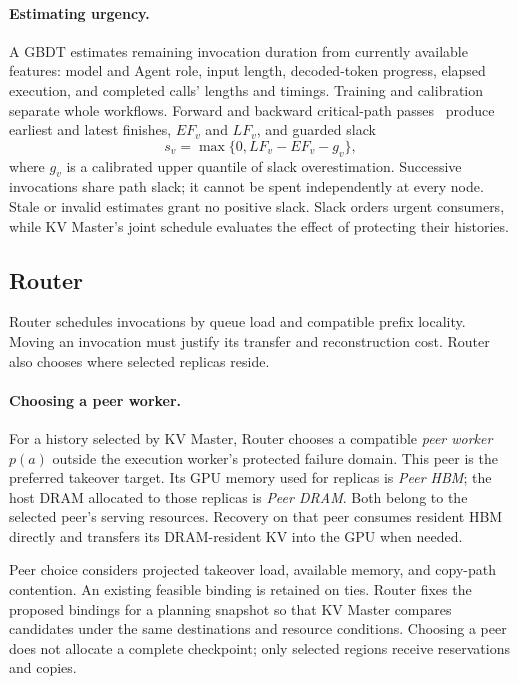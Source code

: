 \paragraph{Estimating urgency.}
A GBDT estimates remaining invocation duration from currently available
features: model and Agent role, input length, decoded-token progress,
elapsed execution, and completed calls' lengths and timings. Training
and calibration separate whole workflows. Forward and backward
critical-path passes~\cite{kelley1959cpm} produce earliest and latest
finishes, $EF_v$ and $LF_v$, and guarded slack
\begin{equation}
 s_v=\max\{0,LF_v-EF_v-g_v\},
 \label{eq:teacher-slack}
\end{equation}
where $g_v$ is a calibrated upper quantile of slack overestimation.
Successive invocations share path slack; it cannot be spent independently
at every node. Stale or invalid estimates grant no positive slack.
Slack orders urgent consumers, while KV Master's joint schedule evaluates
the effect of protecting their histories.

\subsection{Router}
\label{sec:teacher-router}

Router schedules invocations by queue load and compatible prefix
locality. Moving an invocation must justify its transfer and
reconstruction cost. Router also chooses where selected replicas reside.

\paragraph{Choosing a peer worker.}
For a history selected by KV Master, Router chooses a compatible
\emph{peer worker} $p(a)$ outside the execution worker's protected
failure domain. This peer is the preferred takeover target. Its GPU
memory used for replicas is \emph{Peer HBM}; the host DRAM allocated to
those replicas is \emph{Peer DRAM}. Both belong to the selected peer's
serving resources. Recovery on that peer consumes resident HBM directly
and transfers its DRAM-resident KV into the GPU when needed.

Peer choice considers projected takeover load, available memory, and
copy-path contention. An existing feasible binding is retained on ties.
Router fixes the proposed bindings for a planning snapshot so that KV
Master compares candidates under the same destinations and resource
conditions. Choosing a peer does not allocate a complete checkpoint;
only selected regions receive reservations and copies.

